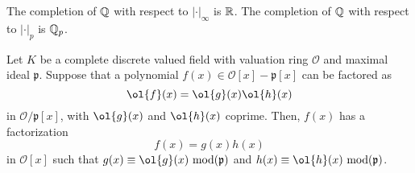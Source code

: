 \begin{example}
    The completion of $\mathbb{Q}$ with respect to $|\cdot|_\infty$ is $\mathbb{R}$. The completion of $\mathbb{Q}$ with respect to $|\cdot|_p$ is $\mathbb{Q}_p$.
\end{example}

\begin{theorem}
    Let $K$ be a complete discrete valued field with valuation ring $\mathcal{O}$ and maximal ideal $\mathfrak{p}$. Suppose that a polynomial $f(x) \in \mathcal{O}[x] - \mathfrak{p}[x]$ can be factored as
        \[\ol{f}(x) = \ol{g}(x)\ol{h}(x)\]
    in $\mathcal{O}/\mathfrak{p}[x]$, with $\ol{g}(x)$ and $\ol{h}(x)$ coprime. Then, $f(x)$ has a factorization
        \[f(x) = g(x) h(x)\]
    in $\mathcal{O}[x]$ such that $g(x) \equiv \ol{g}(x) \textrm{ mod}(\mathfrak{p})$ and $h(x) \equiv \ol{h}(x) \textrm{ mod}(\mathfrak{p})$.
\end{theorem}
